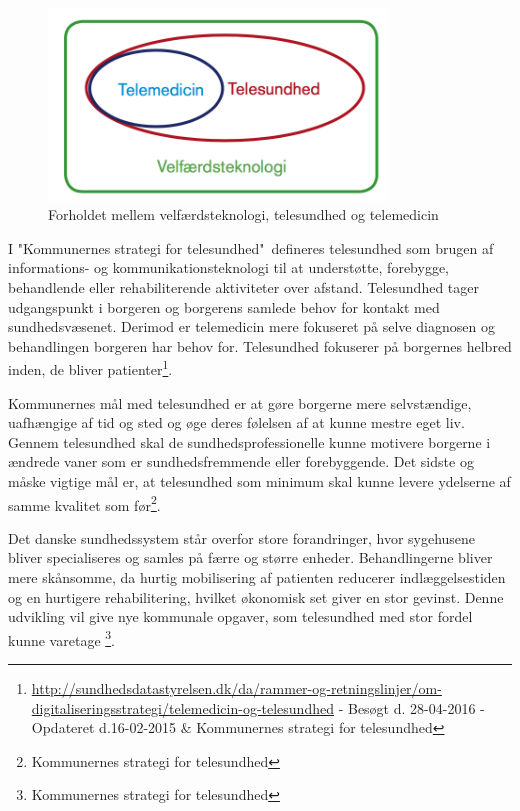 \begin{figure}[H]
	\centering
	\includegraphics[width=0.8\textwidth]{Figurer/Snip20160426_6}
	\caption{Forholdet mellem velfærdsteknologi, telesundhed og telemedicin \protect\footnotemark}
\end{figure}

I "Kommunernes strategi for telesundhed"\ defineres telesundhed som brugen af informations- og kommunikationsteknologi til at understøtte, forebygge, behandlende eller rehabiliterende aktiviteter over afstand. Telesundhed tager udgangspunkt i borgeren og borgerens samlede behov for kontakt med sundhedsvæsenet. Derimod er telemedicin mere fokuseret på selve diagnosen og behandlingen borgeren har behov for. Telesundhed fokuserer på borgernes helbred inden, de bliver patienter\footnote{\url{http://sundhedsdatastyrelsen.dk/da/rammer-og-retningslinjer/om-digitaliseringsstrategi/telemedicin-og-telesundhed} - Besøgt d. 28-04-2016 - Opdateret d.16-02-2015 \& Kommunernes strategi for telesundhed}.

Kommunernes mål med telesundhed er at gøre borgerne mere selvstændige, uafhængige af tid og sted og øge deres følelsen af at kunne mestre eget liv. Gennem telesundhed skal de sundhedsprofessionelle kunne motivere borgerne i ændrede vaner som er sundhedsfremmende eller forebyggende. Det sidste og måske vigtige mål er, at telesundhed som minimum skal kunne levere ydelserne af samme kvalitet som før\footnote{Kommunernes strategi for telesundhed}. 

Det danske sundhedssystem står overfor store forandringer, hvor sygehusene bliver specialiseres og samles på færre og større enheder. Behandlingerne bliver mere skånsomme, da hurtig mobilisering af patienten reducerer indlæggelsestiden og en hurtigere rehabilitering, hvilket økonomisk set giver en stor gevinst. Denne udvikling vil give nye kommunale opgaver, som telesundhed med stor fordel kunne varetage     \footnote{Kommunernes strategi for telesundhed}.

